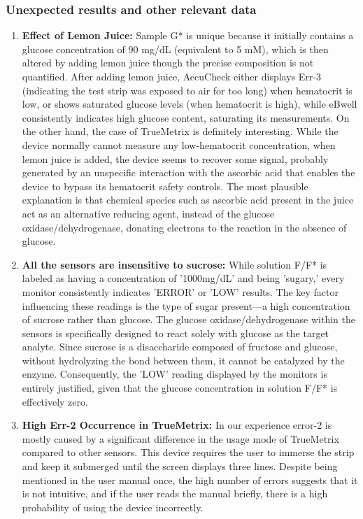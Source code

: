 \documentclass[conference]{IEEEtran}
\begin{document}
 \subsubsection{Unexpected results and other relevant data}
 \begin{enumerate}
   \item \textbf{Effect of Lemon Juice:} Sample G* is unique because it initially contains a glucose concentration of 90 mg/dL (equivalent to 5 mM), which is then altered by adding lemon juice though the precise composition is not quantified. 
   After adding lemon juice, AccuCheck either displays Err-3 (indicating the test strip was exposed to air for too long)
   when hematocrit is low, or shows saturated glucose levels (when hematocrit is high), while eBwell consistently indicates high glucose content, saturating its measurements. On the other hand, the case of TrueMetrix is definitely interesting.
   While the device normally cannot measure any low-hematocrit concentration, when lemon juice is added, the device seems to recover some signal, probably generated by an unspecific interaction with the ascorbic acid that enables the device to bypass its hematocrit
   safety controls. The most plausible explanation is that chemical species such as ascorbic acid present in the juice act as an alternative reducing agent, instead of the glucose oxidase/dehydrogenase, donating electrons to the reaction in the absence of glucose.
   \item \textbf{All the sensors are insensitive to sucrose:} While solution F/F* 
   is labeled as having a concentration of '1000mg/dL' and being 'sugary,' 
   every monitor consistently indicates 'ERROR' or 'LOW' results. The key 
   factor influencing these readings is the type of sugar present—a high 
   concentration of sucrose rather than glucose. The glucose 
   oxidase/dehydrogenase within the sensors is specifically designed to 
   react solely with glucose as the target analyte. Since sucrose is a 
   disaccharide composed of fructose and glucose, without hydrolyzing the 
   bond between them, it cannot be catalyzed by the enzyme. Consequently, 
   the 'LOW' reading displayed by the monitors is entirely justified, given 
   that the glucose concentration in solution F/F* is effectively zero.   
     \item \textbf{High Err-2 Occurrence in TrueMetrix:} In our experience error-2 is mostly caused by a significant difference in the usage mode of TrueMetrix compared to other sensors. This device requires the user to 
     immerse the strip and keep it submerged until the screen displays three lines. Despite being mentioned in the user manual once, the high number of errors suggests that it is not intuitive, and if the 
     user reads the manual briefly, there is a high probability of using the device incorrectly. 
   \end{enumerate}
\end{document}

